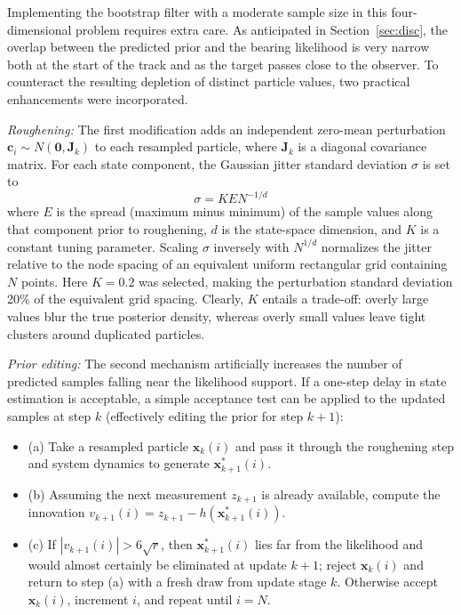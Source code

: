 

Implementing the bootstrap filter with a moderate sample size in this four-dimensional problem requires extra care. As anticipated in Section~\ref{sec:disc}, the overlap between the predicted prior and the bearing likelihood is very narrow both at the start of the track and as the target passes close to the observer. To counteract the resulting depletion of distinct particle values, two practical enhancements were incorporated.

\emph{Roughening:} The first modification adds an independent zero-mean perturbation $\bm{c}_i \sim N(\bm{0}, \bm{J}_k)$ to each resampled particle, where $\bm{J}_k$ is a diagonal covariance matrix. For each state component, the Gaussian jitter standard deviation $\sigma$ is set to
\begin{equation*}
\sigma = K E N^{-1/d}
\end{equation*}
where $E$ is the spread (maximum minus minimum) of the sample values along that component prior to roughening, $d$ is the state-space dimension, and $K$ is a constant tuning parameter. Scaling $\sigma$ inversely with $N^{1/d}$ normalizes the jitter relative to the node spacing of an equivalent uniform rectangular grid containing $N$ points. Here $K = 0.2$ was selected, making the perturbation standard deviation 20\% of the equivalent grid spacing. Clearly, $K$ entails a trade-off: overly large values blur the true posterior density, whereas overly small values leave tight clusters around duplicated particles.

\emph{Prior editing:} The second mechanism artificially increases the number of predicted samples falling near the likelihood support. If a one-step delay in state estimation is acceptable, a simple acceptance test can be applied to the updated samples at step $k$ (effectively editing the prior for step $k + 1$):

\begin{itemize}
\item (a) Take a resampled particle $\bm{x}_k(i)$ and pass it through the roughening step and system dynamics to generate $\bm{x}_{k+1}^*(i)$.
\item (b) Assuming the next measurement $z_{k+1}$ is already available, compute the innovation $v_{k+1}(i) = z_{k+1} - h(\bm{x}_{k+1}^*(i))$.
\item (c) If $|v_{k+1}(i)| > 6\sqrt{r}$, then $\bm{x}_{k+1}^*(i)$ lies far from the likelihood and would almost certainly be eliminated at update $k + 1$; reject $\bm{x}_k(i)$ and return to step (a) with a fresh draw from update stage $k$. Otherwise accept $\bm{x}_k(i)$, increment $i$, and repeat until $i = N$.
\end{itemize}

